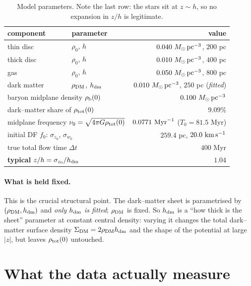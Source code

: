 \documentclass[11pt,a4paper]{article}
\newcommand{\hdm}{h_{\rm dm}}
\newcommand{\dt}{\Delta t}
\begin{document}
\begin{table}[h]
\centering
\begin{tabular}{llr}
\toprule
component & parameter & value \\
\midrule
thin disc     & $\rho_0$, $h$ & $0.040\ M_\odot\,{\rm pc}^{-3}$, $200$ pc \\
thick disc    & $\rho_0$, $h$ & $0.010\ M_\odot\,{\rm pc}^{-3}$, $400$ pc \\
gas           & $\rho_0$, $h$ & $0.050\ M_\odot\,{\rm pc}^{-3}$, $800$ pc \\
dark matter   & $\rho_{\rm DM}$, $\hdm$ & $0.010\ M_\odot\,{\rm pc}^{-3}$, $250$ pc (\emph{fitted}) \\
\midrule
\multicolumn{2}{l}{baryon midplane density $\rho_{\rm b}(0)$} & $0.100\ M_\odot\,{\rm pc}^{-3}$ \\
\multicolumn{2}{l}{dark--matter share of $\rho_{\rm tot}(0)$} & $9.09\%$ \\
\multicolumn{2}{l}{midplane frequency $\nu_0=\sqrt{4\pi G\rho_{\rm tot}(0)}$} & $0.0771\ {\rm Myr}^{-1}$ ($T_0 = 81.5$ Myr) \\
\midrule
\multicolumn{2}{l}{initial DF $f_0$: $\sigma_{z_0}$, $\sigma_{w_0}$} & $259.4$ pc, $20.0\ {\rm km\,s^{-1}}$ \\
\multicolumn{2}{l}{true total flow time $\dt$} & $400$ Myr \\
\multicolumn{2}{l}{\textbf{typical} $z/h = \sigma_{z_0}/\hdm$} & $\mathbf{1.04}$ \\
\bottomrule
\end{tabular}
\caption{Model parameters.  Note the last row: the stars sit at $z\sim h$, so no
expansion in $z/h$ is legitimate.}
\label{tab:params}
\end{table}

\paragraph{What is held fixed.}  This is the crucial structural point.  The
dark--matter sheet is parametrised by $(\rho_{\rm DM}, \hdm)$ and \emph{only
$\hdm$ is fitted}; $\rho_{\rm DM}$ is fixed.  So $\hdm$ is a ``how thick is the
sheet'' parameter at constant central density: varying it changes the total
dark--matter surface density $\Sigma_{\rm DM}=2\rho_{\rm DM}\hdm$ and the shape
of the potential at large $|z|$, but leaves $\rho_{\rm tot}(0)$ untouched.

\section{What the data actually measure}
\end{document}
